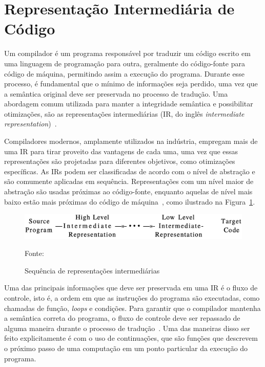 \section{Representação Intermediária de Código}\label{sec:IR}

Um compilador é um programa responsável por traduzir um código escrito em uma linguagem de programação para outra, geralmente do código-fonte para código de máquina, permitindo assim a execução do programa.
Durante esse processo, é fundamental que o mínimo de informações seja perdido, uma vez que a semântica original deve ser preservada no processo de tradução.
Uma abordagem comum utilizada para manter a integridade semântica e possibilitar otimizações, são as representações intermediárias (IR, do inglês \textit{intermediate representation})~\cite{cooper2014construindo}.

Compiladores modernos, amplamente utilizados na indústria, empregam mais de uma IR para tirar proveito das vantagens de cada uma, uma vez que essas representações são projetadas para diferentes objetivos, como otimizações específicas.
As IRs podem ser classificadas de acordo com o nível de abstração e são comumente aplicadas em sequência.
Representações com um nível maior de abstração são usadas próximas ao código-fonte, enquanto aquelas de nível mais baixo estão mais próximas do código de máquina~\cite{aho2008compilers}, como ilustrado na Figura~\ref{fig:abstraction-level-irs}.

\begin{figure}
  \centering
  \includegraphics[width=.7\textwidth]{Imagens/abstraction-level-irs.eps}
  \caption{Sequência de representações intermediárias}\label{fig:abstraction-level-irs}
  \small{Fonte:~\cite{aho2008compilers}}
\end{figure}

Uma das principais informações que deve ser preservada em uma IR é o fluxo de controle, isto é, a ordem em que as instruções do programa são executadas, como chamadas de função, \textit{loops} e condições.
Para garantir que o compilador mantenha a semântica correta do programa, o fluxo de controle deve ser repassado de alguma maneira durante o processo de tradução~\cite{cooper2014construindo}.
Uma das maneiras disso ser feito explicitamente é com o uso de continuações, que são funções que descrevem o próximo passo de uma computação em um ponto particular da execução do programa.


